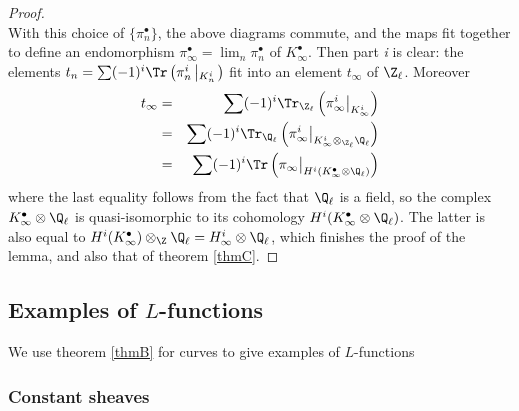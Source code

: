 \begin{proof}
$$$$
With this choice of $\{\pi_n^\bullet\}$, the above diagrams commute, and the maps fit together to define an endomorphism $\pi_\infty^\bullet = \lim_n\pi_n^\bullet$ of $K_\infty^\bullet$. Then part {\it i} is clear: the elements $t_n = \sum(-1)^i \Tr\left(\pi_n^i\left|_{K_n^i}\right.\right)$ fit into an element $t_\infty$ of $\Z_\ell$. Moreover
\begin{eqnarray*}
t_\infty & = & \sum(-1)^i \Tr_{\Z_\ell}\left(\pi_\infty^i\big|_{K_\infty^i}\right) \\
& = & \sum(-1)^i \Tr_{\Q_\ell}\left(\pi_\infty^i\big|_{K_\infty^i\otimes_{\Z_\ell}\Q_\ell}\right)\\
& = &\sum(-1)^i\Tr\left(\pi_\infty\big|_{H^i(K_\infty^\bullet\otimes\Q_\ell)}\right)
\end{eqnarray*}
where the last equality follows from the fact that $\Q_\ell$ is a field, so the complex $K_\infty^\bullet\otimes\Q_\ell$ is quasi-isomorphic to its cohomology $H^i(K_\infty^\bullet\otimes\Q_\ell)$. The latter is also equal to $H^i(K_\infty^\bullet)\otimes_{\Z}\Q_\ell = H_\infty^i\otimes \Q_\ell$, which finishes the proof of the lemma, and also that of theorem \ref{thmC}.
\end{proof}



\subsection{Examples of $L$-functions} 

We use theorem \ref{thmB} for curves to give examples of $L$-functions

\subsubsection*{Constant sheaves} 

